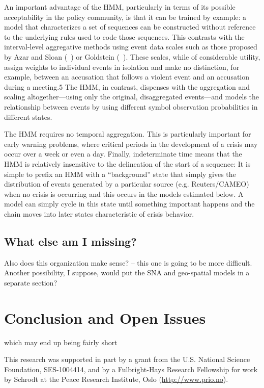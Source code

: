 \documentclass[graybox]{svmult}
\begin{document}
An important advantage of the HMM, particularly in terms of its possible acceptability in
the policy community, is that it can be trained by example: a model that characterizes a set of
sequences can be constructed without reference to the underlying rules used to code those
sequences. This contrasts with the interval-level aggregative methods using event data scales
such as those proposed by Azar and Sloan (~\cite{AzarSloan75}) or Goldstein (~\cite{Goldstein92}). These scales, while of
considerable utility, assign weights to individual events in isolation and make no distinction, for
example, between an accusation that follows a violent event and an accusation during a meeting.5
The HMM, in contrast, dispenses with the aggregation and scaling altogether---using only the
original, disaggregated events---and models the relationship between events by using different
symbol observation probabilities in different states.

The HMM requires no temporal aggregation. This is particularly important for early warning
problems, where critical periods in the development of a crisis may occur over a week or even a
day. Finally, indeterminate time means that the HMM is relatively insensitive to the delineation
of the start of a sequence: It is simple to prefix an HMM with a ``background'' state that simply
gives the distribution of events generated by a particular source (e.g. Reuters/CAMEO) when no
crisis is occurring and this occurs in the models estimated below. A model can simply cycle in
this state until something important happens and the chain moves into later states characteristic
of crisis behavior.


\subsection{What else am I missing?}
\label{subsec:missing2}

Also does this organization make sense? -- this one is going to be more difficult. Another possibility, I suppose, would put the SNA and geo-spatial models in a separate section?




\section{Conclusion and Open Issues}
\label{sec:conclusion}

which may end up being fairly short



\begin{acknowledgement}
This research was supported in part by a grant from the U.S. National Science Foundation, SES-1004414, and by a Fulbright-Hays Research Fellowship for work by Schrodt at the Peace Research Institute, Oslo (\url{http://www.prio.no}).
\end{acknowledgement}




%
\end{document}
